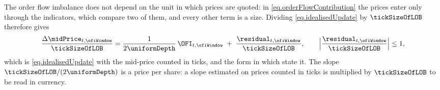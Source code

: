 The order flow imbalance does not depend on the unit in which prices are quoted:
in \eqref{eq.orderFlowContribution} the prices enter only through the indicators,
which compare two of them,
and every other term is a size.
Dividing \eqref{eq.idealisedUpdate} by $\tickSizeOfLOB$ therefore gives
\[
 \frac{\Delta \midPrice_{t,\ofiWindow}}{\tickSizeOfLOB}
 = \frac{1}{2\uniformDepth} \, \OFI_{t,\ofiWindow}
 \; + \; \frac{\residual_{t,\ofiWindow}}{\tickSizeOfLOB},
 \qquad
 \Big\vert \frac{\residual_{t,\ofiWindow}}{\tickSizeOfLOB} \Big\vert \leq 1 ,
\]
which is \eqref{eq.idealisedUpdate} with the mid-price counted in ticks,
and the form in which \cite{CKS14pri} state it.
The slope $\tickSizeOfLOB / (2\uniformDepth)$ is a price per share:
a slope estimated on prices counted in ticks is multiplied by $\tickSizeOfLOB$
to be read in currency.
